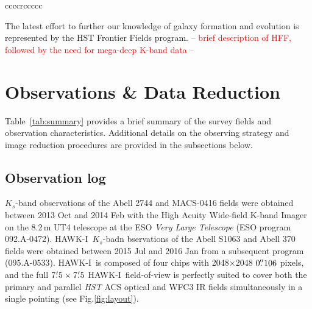 \documentclass[preprint2]{aastex6}
\gdef\HAWKI{\mbox{HAWK-I}}
\begin{document}
\begin{deluxetable*}{ccccrccccc}
\end{deluxetable*}


The latest effort to further our knowledge of galaxy formation and evolution is represented by the HST Frontier Fields program. \textcolor{red}{-- brief description of HFF, followed by the need for mega-deep K-band data --}


\section{Observations \& Data Reduction}
\label{s:observations}

Table~\ref{tab:summary} provides a brief summary of the survey fields and observation characteristics.  Additional details on the observing strategy and image reduction procedures are provided in the subsections below.

\subsection{Observation log}
\label{s:log}

$K_s$-band observations of the Abell 2744 and MACS-0416 fields were obtained between 2013 Oct and 2014 Feb with the High Acuity Wide-field K-band Imager \citep[\HAWKI;][]{hawki, hawki2} on the 8.2\,m UT4 telescope at the ESO \textit{Very Large Telescope} (ESO program \mbox{092.A-0472}).  \HAWKI\ $K_s$-badn bservations of the Abell S1063 and Abell 370 fields were obtained between 2015 Jul and 2016 Jan from a subsequent program (095.A-0533).  \HAWKI\ is composed of four chips with 2048$\times$2048 $0\mbox{$.\!\!^{\prime\prime}$}106$ pixels, and the full $7\mbox{$.\mkern-4mu^\prime$}5\times7\mbox{$.\mkern-4mu^\prime$}5$ \HAWKI\ field-of-view is perfectly suited to cover both the primary and parallel \textit{HST} ACS optical and WFC3 IR fields simultaneously in a single pointing (see Fig.\ref{fig:layout}).
\end{document}
